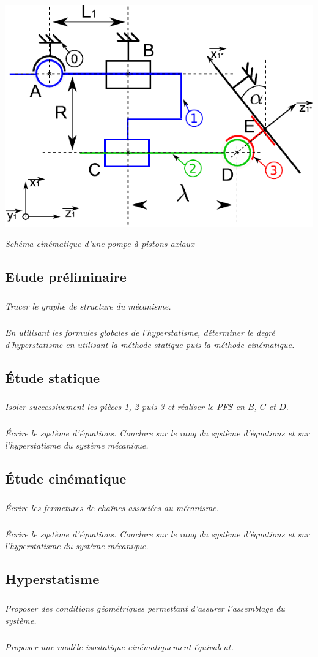\documentclass[10pt,fleqn]{article} %
\begin{document}
\begin{multicols}{2}
\begin{multicols}{2}
\begin{center}
 \includegraphics[width=.9\linewidth]{images/pompe_cine.pdf}
 
 \textit{Schéma cinématique d'une pompe à pistons axiaux \label{fig:cine_pompe}}
\end{center}

\subsection*{Etude préliminaire}
\subparagraph{}\textit{Tracer le graphe de structure du mécanisme.}

\subparagraph{}\textit{En utilisant les formules globales de l'hyperstatisme, déterminer le degré d'hyperstatisme en utilisant la méthode statique puis la méthode cinématique.}


\subsection*{Étude statique}

\subparagraph{}\textit{Isoler successivement les pièces 1, 2 puis 3 et réaliser le PFS en $B$, $C$ et $D$.}

\subparagraph{}\textit{Écrire le système d'équations. Conclure sur le rang du système d'équations et sur l'hyperstatisme du système mécanique.}

\subsection*{Étude cinématique}

\subparagraph{}\textit{Écrire les fermetures de chaînes associées au mécanisme. }
\subparagraph{}\textit{Écrire le système d'équations. Conclure sur le rang du système d'équations et sur l'hyperstatisme du système mécanique.}

\subsection*{Hyperstatisme}
\subparagraph{}\textit{Proposer des conditions géométriques permettant d'assurer l'assemblage du système. }
\subparagraph{}\textit{Proposer une modèle isostatique cinématiquement équivalent. }

\ifprof
\end{multicols}
\else
\end{multicols}
\end{document}
